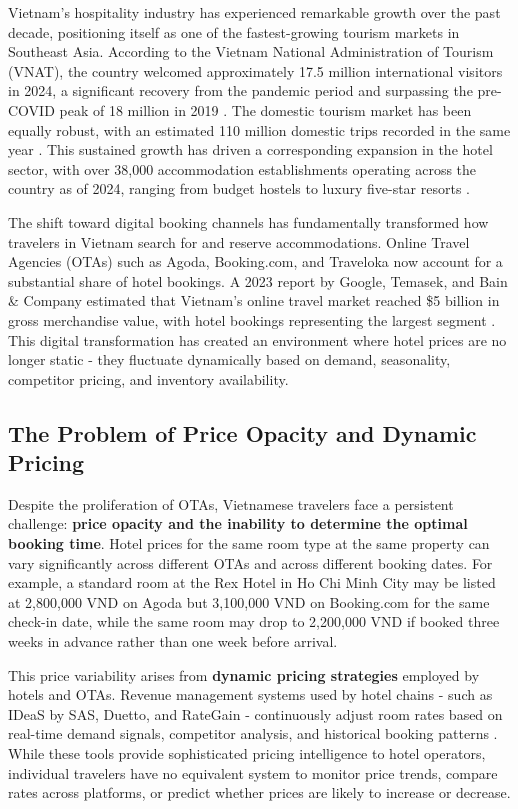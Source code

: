 \documentclass[12pt,a4paper]{report}
\begin{document}
Vietnam's hospitality industry has experienced remarkable growth over the past decade, positioning itself as one of the fastest-growing tourism markets in Southeast Asia. According to the Vietnam National Administration of Tourism (VNAT), the country welcomed approximately 17.5 million international visitors in 2024, a significant recovery from the pandemic period and surpassing the pre-COVID peak of 18 million in 2019 \cite{vnat2024}. The domestic tourism market has been equally robust, with an estimated 110 million domestic trips recorded in the same year \cite{vnexpress2024}. This sustained growth has driven a corresponding expansion in the hotel sector, with over 38,000 accommodation establishments operating across the country as of 2024, ranging from budget hostels to luxury five-star resorts \cite{vnat2024}.

The shift toward digital booking channels has fundamentally transformed how travelers in Vietnam search for and reserve accommodations. Online Travel Agencies (OTAs) such as Agoda, Booking.com, and Traveloka now account for a substantial share of hotel bookings. A 2023 report by Google, Temasek, and Bain \& Company estimated that Vietnam's online travel market reached \$5 billion in gross merchandise value, with hotel bookings representing the largest segment \cite{googletemasek2023}. This digital transformation has created an environment where hotel prices are no longer static - they fluctuate dynamically based on demand, seasonality, competitor pricing, and inventory availability.

\subsection{The Problem of Price Opacity and Dynamic Pricing}

Despite the proliferation of OTAs, Vietnamese travelers face a persistent challenge: \textbf{price opacity and the inability to determine the optimal booking time}. Hotel prices for the same room type at the same property can vary significantly across different OTAs and across different booking dates. For example, a standard room at the Rex Hotel in Ho Chi Minh City may be listed at 2,800,000 VND on Agoda but 3,100,000 VND on Booking.com for the same check-in date, while the same room may drop to 2,200,000 VND if booked three weeks in advance rather than one week before arrival.

This price variability arises from \textbf{dynamic pricing strategies} employed by hotels and OTAs. Revenue management systems used by hotel chains - such as IDeaS by SAS, Duetto, and RateGain - continuously adjust room rates based on real-time demand signals, competitor analysis, and historical booking patterns \cite{ivanov2014}. While these tools provide sophisticated pricing intelligence to hotel operators, individual travelers have no equivalent system to monitor price trends, compare rates across platforms, or predict whether prices are likely to increase or decrease.
\end{document}
